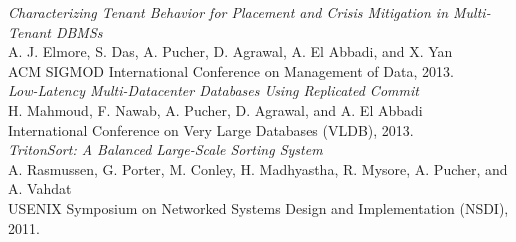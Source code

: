 \begin{vitae}
\textit{Characterizing Tenant Behavior for Placement and Crisis Mitigation in Multi-Tenant DBMSs} \\
A. J. Elmore, S. Das, A. Pucher, D. Agrawal, A. El Abbadi, and X. Yan \\
ACM SIGMOD International Conference on Management of Data, 2013. \\

\textit{Low-Latency Multi-Datacenter Databases Using Replicated Commit} \\
H. Mahmoud, F. Nawab, A. Pucher, D. Agrawal, and A. El Abbadi \\
International Conference on Very Large Databases (VLDB), 2013. \\

\textit{TritonSort: A Balanced Large-Scale Sorting System} \\
A. Rasmussen, G. Porter, M. Conley, H. Madhyastha, R. Mysore, A. Pucher, and A. Vahdat \\
USENIX Symposium on Networked Systems Design and Implementation (NSDI), 2011. \\

\end{vitae}